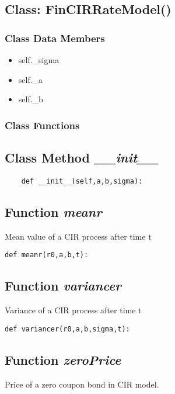 \documentclass[twoside,11pt]{book}
\begin{document}
\subsection{Class: FinCIRRateModel()}


\subsubsection{Class Data Members}
\begin{itemize}
\item{self.\_sigma}
\item{self.\_a}
\item{self.\_b}
\end{itemize}

\subsubsection{Class Functions}

\subsection{Class Method {\it \_\_init\_\_}}


\begin{lstlisting}
    def __init__(self,a,b,sigma):
\end{lstlisting}

\subsection{Function {\it meanr}}
Mean value of a CIR process after time t 

\begin{lstlisting}
def meanr(r0,a,b,t):
\end{lstlisting}

\subsection{Function {\it variancer}}
Variance of a CIR process after time t 

\begin{lstlisting}
def variancer(r0,a,b,sigma,t):
\end{lstlisting}

\subsection{Function {\it zeroPrice}}
Price of a zero coupon bond in CIR model. 
\end{document}

